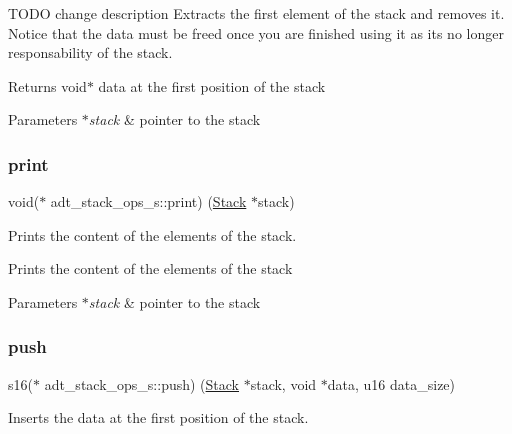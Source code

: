 T\+O\+DO change description Extracts the first element of the stack and removes it. Notice that the data must be freed once you are finished using it as it\textquotesingle{}s no longer responsability of the stack.

\begin{DoxyReturn}{Returns}
void$\ast$ data at the first position of the stack 
\end{DoxyReturn}

\begin{DoxyParams}{Parameters}
{\em $\ast$stack} & pointer to the stack \\
\hline
\end{DoxyParams}
\mbox{\label{structadt__stack__ops__s_af91bd0c94f3d8638a8ffaba45936372c}} 
\subsubsection{\texorpdfstring{print}{print}}
{\footnotesize\ttfamily void($\ast$ adt\+\_\+stack\+\_\+ops\+\_\+s\+::print) (\hyperlink{structadt__stack__s}{Stack} $\ast$stack)}



Prints the content of the elements of the stack. 

Prints the content of the elements of the stack


\begin{DoxyParams}{Parameters}
{\em $\ast$stack} & pointer to the stack \\
\hline
\end{DoxyParams}
\mbox{\label{structadt__stack__ops__s_a338622d8e3c8f09ecf73d80cb0f59466}} 
\subsubsection{\texorpdfstring{push}{push}}
{\footnotesize\ttfamily s16($\ast$ adt\+\_\+stack\+\_\+ops\+\_\+s\+::push) (\hyperlink{structadt__stack__s}{Stack} $\ast$stack, void $\ast$data, u16 data\+\_\+size)}



Inserts the data at the first position of the stack. 

